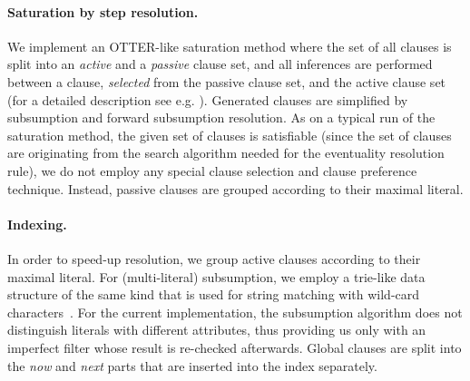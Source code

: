 \documentclass[11pt]{article}
\begin{document}
\paragraph{Saturation by step resolution.}
We implement an OTTER-like saturation method where the set of all clauses is
split into an \emph{active} and a \emph{passive} clause set, and all inferences
are performed between a clause, \emph{selected} from the passive clause set,
and the active clause set (for a detailed description see e.g. \cite{RV01}).
Generated clauses are simplified by subsumption and forward subsumption
resolution. As on a typical run of the saturation method, the given set of
clauses is satisfiable (since the set of clauses are originating from the
search algorithm needed for the eventuality resolution rule), we do not employ
any special clause selection and clause preference technique. Instead, passive
clauses are grouped according to their maximal literal.

\paragraph{Indexing.}
In order to speed-up resolution, we group active clauses according to their 
maximal literal. For (multi-literal) subsumption, we employ a trie-like 
data structure of the same kind that is used for string matching with
wild-card characters~\cite{BS97}. For the current implementation, the
subsumption algorithm does not distinguish literals with different
attributes, thus providing us only with an imperfect filter whose
result is re-checked afterwards. Global clauses are split into the 
\emph{now} and \emph{next} parts that are inserted into the index separately.
\end{document}
